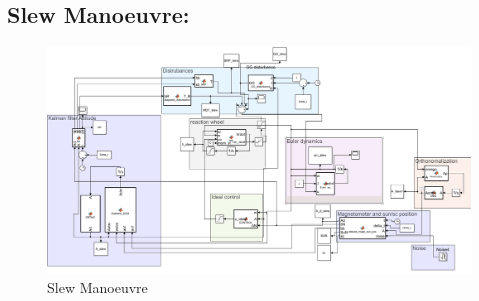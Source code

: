 \documentclass[11pt]{article}
\begin{document}
 \subsection{Slew Manoeuvre:} 
 \begin{figure} [H]
\centering 
\includegraphics[scale=0.68]{slew.PNG}
\caption{ Slew Manoeuvre}

\end{figure}
\end{document}
